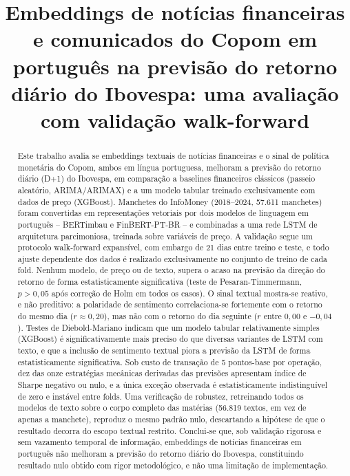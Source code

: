 \documentclass[conference]{IEEEtran}
\begin{document}
\title{Embeddings de not\'icias financeiras e comunicados do Copom em portugu\^es na previs\~ao do retorno di\'ario do Ibovespa: uma avalia\c{c}\~ao com valida\c{c}\~ao walk-forward}

\author{
}

\maketitle

\begin{abstract}
Este trabalho avalia se embeddings textuais de not\'icias financeiras e o sinal de pol\'itica monet\'aria do Copom, ambos em l\'ingua portuguesa, melhoram a previs\~ao do retorno di\'ario (D+1) do Ibovespa, em compara\c{c}\~ao a baselines financeiros cl\'assicos (passeio aleat\'orio, ARIMA/ARIMAX) e a um modelo tabular treinado exclusivamente com dados de pre\c{c}o (XGBoost). Manchetes do InfoMoney (2018--2024, 57.611 manchetes) foram convertidas em representa\c{c}\~oes vetoriais por dois modelos de linguagem em portugu\^es -- BERTimbau e FinBERT-PT-BR -- e combinadas a uma rede LSTM de arquitetura parcimoniosa, treinada sobre vari\'aveis de pre\c{c}o. A valida\c{c}\~ao segue um protocolo walk-forward expans\'ivel, com embargo de 21 dias entre treino e teste, e todo ajuste dependente dos dados \'e realizado exclusivamente no conjunto de treino de cada fold. Nenhum modelo, de pre\c{c}o ou de texto, supera o acaso na previs\~ao da dire\c{c}\~ao do retorno de forma estatisticamente significativa (teste de Pesaran-Timmermann, $p>0{,}05$ ap\'os corre\c{c}\~ao de Holm em todos os casos). O sinal textual mostra-se reativo, e n\~ao preditivo: a polaridade de sentimento correlaciona-se fortemente com o retorno do mesmo dia ($r\approx0{,}20$), mas n\~ao com o retorno do dia seguinte ($r$ entre $0{,}00$ e $-0{,}04$). Testes de Diebold-Mariano indicam que um modelo tabular relativamente simples (XGBoost) \'e significativamente mais preciso do que diversas variantes de LSTM com texto, e que a inclus\~ao de sentimento textual piora a previs\~ao da LSTM de forma estatisticamente significativa. Sob custo de transa\c{c}\~ao de 5 pontos-base por opera\c{c}\~ao, dez das onze estrat\'egias mec\^anicas derivadas das previs\~oes apresentam \'indice de Sharpe negativo ou nulo, e a \'unica exce\c{c}\~ao observada \'e estatisticamente indistingu\'ivel de zero e inst\'avel entre folds. Uma verifica\c{c}\~ao de robustez, retreinando todos os modelos de texto sobre o corpo completo das mat\'erias (56.819 textos, em vez de apenas a manchete), reproduz o mesmo padr\~ao nulo, descartando a hip\'otese de que o resultado decorra do escopo textual restrito. Conclui-se que, sob valida\c{c}\~ao rigorosa e sem vazamento temporal de informa\c{c}\~ao, embeddings de not\'icias financeiras em portugu\^es n\~ao melhoram a previs\~ao do retorno di\'ario do Ibovespa, constituindo resultado nulo obtido com rigor metodol\'ogico, e n\~ao uma limita\c{c}\~ao de implementa\c{c}\~ao.

\end{abstract}
\end{document}

